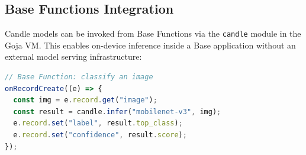 \subsection{Base Functions Integration}

Candle models can be invoked from Base Functions via the \texttt{candle}
module in the Goja VM. This enables on-device inference inside a Base
application without an external model serving infrastructure:

\begin{lstlisting}[language=JavaScript,caption={Candle inference from a Base Function.}]
// Base Function: classify an image
onRecordCreate((e) => {
  const img = e.record.get("image");
  const result = candle.infer("mobilenet-v3", img);
  e.record.set("label", result.top_class);
  e.record.set("confidence", result.score);
});
\end{lstlisting}

